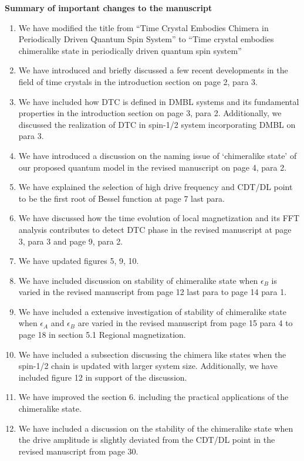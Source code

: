 \documentclass[aps,prb,reprint,showpacs,floatfix,superscriptaddress, onecolumn, nofootinbib, 10pt]{revtex4-2}
\begin{document}
		
\newpage		
\noindent \textbf{Summary of important changes to the  manuscript}
\begin{enumerate}
	\item We have modified the title from ``Time Crystal Embodies Chimera in Periodically Driven Quantum Spin System'' to ``Time crystal embodies chimeralike state in periodically driven quantum spin system''
	\item We have introduced and briefly discussed a few recent developments in the field of time crystals in the introduction section on page 2, para 3.
	\item We have included how DTC is defined in DMBL systems and its fundamental properties in the introduction section on page 3, para 2. Additionally, we discussed the realization of DTC in spin-1/2 system incorporating DMBL on para 3.
	\item We have introduced a discussion on the naming issue of `chimeralike state' of our proposed quantum model in the revised manuscript on page 4, para 2.
	\item We have explained the selection of high drive frequency and CDT/DL point to be the first root of Bessel function at page 7 last para.
	\item We have discussed how the time evolution of local magnetization and its FFT analysis contributes to detect DTC phase in the revised manuscript at page 3, para 3 and page 9, para 2.
	\item We have updated figures 5, 9, 10.
	\item We have included discussion on stability of chimeralike state when $\epsilon_B$ is varied in the revised manuscript from page 12 last para to page 14 para 1.
	\item We have included a extensive investigation of stability of chimeralike state when $\epsilon_A$ and $\epsilon_B$ are varied in the revised manuscript from page 15 para 4 to page 18 in section 5.1 Regional magnetization.
	\item We have included a subsection discussing the chimera like states when the spin-1/2 chain is updated with larger system size. Additionally, we have included figure 12 in support of the discussion.
	\item We have improved the section 6. including the practical applications of the chimeralike state.
	\item We have included a discussion on the stability of the chimeralike state when the drive amplitude is slightly deviated from the CDT/DL point in the revised manuscript from page 30.
 \end{enumerate}



\end{document}
